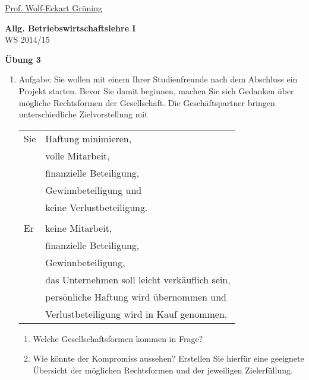 \documentclass[12pt,a4paper]{scrreprt}
\begin{document}
 
\begin{flushleft}
\href{mailto:gruening@informatik.htw-dresden.de}{Prof. Wolf-Eckart Grüning}
\end{flushleft}

\begin{center}
\large{\textbf{ Allg. Betriebswirtschaftslehre I}} \\
WS 2014/15 \end{center}

\begin{center}\large{\textbf{ Übung 3 }} \end{center}

\bigskip
\begin{enumerate}%

 	\item{Aufgabe:}
 	Sie wollen mit einem Ihrer Studienfreunde nach dem Abschluss ein Projekt starten. Bevor Sie damit
beginnen, machen Sie sich Gedanken über mögliche Rechtsformen der Gesellschaft. Die
Geschäftspartner bringen unterschiedliche Zielvorstellung mit

	\begin{tabular}{ll}
	Sie 
		& Haftung minimieren, \\
		& volle Mitarbeit, \\
		& finanzielle Beteiligung, \\
		& Gewinnbeteiligung und \\
		& keine Verlustbeteiligung. \\
\\
	Er
		& keine Mitarbeit, \\
		& finanzielle Beteiligung, \\
		& Gewinnbeteiligung, \\
		& das Unternehmen soll leicht verkäuflich sein, \\
		& persönliche Haftung wird übernommen und \\
		& Verlustbeteiligung wird in Kauf genommen.
	\end{tabular}

	\begin{enumerate} 
		\item Welche Gesellschaftsformen kommen in Frage?



		\item Wie könnte der Kompromiss aussehen? Erstellen Sie hierfür eine geeignete Übersicht der
möglichen Rechtsformen und der jeweiligen Zielerfüllung.
	\end{enumerate} 


\end{enumerate}
\end{document}
